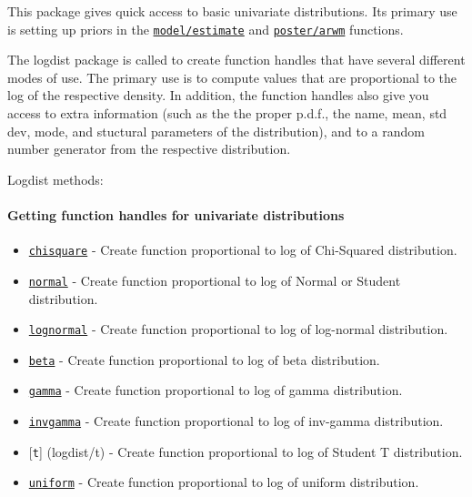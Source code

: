 

	This package gives quick access to basic univariate distributions. Its
primary use is setting up priors in the
\href{model/estimate}{\texttt{model/estimate}} and
\href{poster/arwm}{\texttt{poster/arwm}} functions.

The logdist package is called to create function handles that have
several different modes of use. The primary use is to compute values
that are proportional to the log of the respective density. In addition,
the function handles also give you access to extra information (such as
the the proper p.d.f., the name, mean, std dev, mode, and stuctural
parameters of the distribution), and to a random number generator from
the respective distribution.

Logdist methods:

\paragraph{Getting function handles for univariate
distributions}\label{getting-function-handles-for-univariate-distributions}

\begin{itemize}
\itemsep1pt\parskip0pt
\item
  \href{logdist/chisquare}{\texttt{chisquare}} - Create function
  proportional to log of Chi-Squared distribution.
\item
  \href{logdist/normal}{\texttt{normal}} - Create function proportional
  to log of Normal or Student distribution.
\item
  \href{logdist/lognormal}{\texttt{lognormal}} - Create function
  proportional to log of log-normal distribution.
\item
  \href{logdist/beta}{\texttt{beta}} - Create function proportional to
  log of beta distribution.
\item
  \href{logdist/gamma}{\texttt{gamma}} - Create function proportional to
  log of gamma distribution.
\item
  \href{logdist/invgamma}{\texttt{invgamma}} - Create function
  proportional to log of inv-gamma distribution.
\item
  {[}\texttt{t}{]} (logdist/t) - Create function proportional to log of
  Student T distribution.
\item
  \href{logdist/uniform}{\texttt{uniform}} - Create function
  proportional to log of uniform distribution.
\end{itemize}


